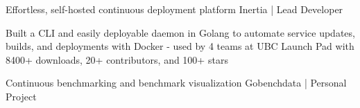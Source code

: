  {\scshape{}}
\begin{cventries}

  \cventry
    {Effortless, self-hosted continuous deployment platform} %
    {Inertia | Lead Developer} %
    {} %
    {} %
    {
      \begin{cvitems} %
        \item {Built a CLI and easily deployable daemon in Golang to automate service updates, builds, and deployments with Docker - used by 4 teams at UBC Launch Pad with 8400+ downloads, 20+ contributors, and 100+ stars}
      \end{cvitems}
    }
\iffalse
  \cventry
    {Game scouting and performance analytics for League of Legends teams} %
    {Seer | Personal Project} %
    {\linktext{bobheadxi.dev/r/seer}} %
    {} %
    {
      \begin{cvitems} %
        \item {Leveraged Google BigQuery as a data warehouse for team match history and queries for trends and aggregations}
        \item {Built a job-based framework in Go for ingesting data and for error resilience (e.g. rate limits of dependencies)}
      \end{cvitems}
    }
\fi
\iffalse
  \cventry
    {Continuous benchmarking and benchmark visualization} %
    {Gobenchdata | Personal Project} %

\end{cventries}
